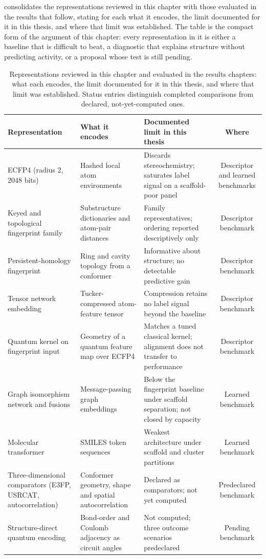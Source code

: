  consolidates the representations reviewed in this chapter with those evaluated in the results that follow, stating for each what it encodes, the limit documented for it in this thesis, and where that limit was established. The table is the compact form of the argument of this chapter: every representation in it is either a baseline that is difficult to beat, a diagnostic that explains structure without predicting activity, or a proposal whose test is still pending.

\begin{table}[htbp]
	\centering
	\caption[Representations reviewed, their information content and their documented limits]{Representations reviewed in this chapter and evaluated in the results chapters: what each encodes, the limit documented for it in this thesis, and where that limit was established. Status entries distinguish completed comparisons from declared, not-yet-computed ones.}
	\label{tab:ch1_representation_map}
	\small
	\begin{tabularx}{\textwidth}{X X X c}
		\toprule
		Representation & What it encodes & Documented limit in this thesis & Where \\
		\midrule
		ECFP4 (radius \num{2}, \num{2048} bits) & Hashed local atom environments & Discards stereochemistry; saturates label signal on a scaffold-poor panel & Descriptor and learned benchmarks \\
		Keyed and topological fingerprint family & Substructure dictionaries and atom-pair distances & Family representatives; ordering reported descriptively only & Descriptor benchmark \\
		Persistent-homology fingerprint & Ring and cavity topology from a conformer & Informative about structure; no detectable predictive gain & Descriptor benchmark \\
		Tensor network embedding & Tucker-compressed atom-feature tensor & Compression retains no label signal beyond the baseline & Descriptor benchmark \\
		Quantum kernel on fingerprint input & Geometry of a quantum feature map over ECFP4 & Matches a tuned classical kernel; alignment does not transfer to performance & Descriptor benchmark \\
		Graph isomorphism network and fusions & Message-passing graph embeddings & Below the fingerprint baseline under scaffold separation; not closed by capacity & Learned benchmark \\
		Molecular transformer & SMILES token sequences & Weakest architecture under scaffold and cluster partitions & Learned benchmark \\
		Three-dimensional comparators (E3FP, USRCAT, autocorrelation) & Conformer geometry, shape and spatial autocorrelation & Declared as comparators; not yet computed & Predeclared benchmark \\
		Structure-direct quantum encoding & Bond-order and Coulomb adjacency as circuit angles & Not computed; three outcome scenarios predeclared & Pending benchmark \\
		\bottomrule
	\end{tabularx}
\end{table}

